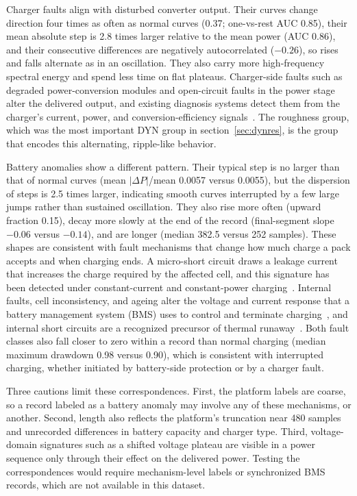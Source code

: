 \documentclass{iopjournal}
\begin{document}
Charger faults align with disturbed converter output. Their curves change direction four times as often as normal curves (0.37; one-vs-rest AUC 0.85), their mean absolute step is 2.8 times larger relative to the mean power (AUC 0.86), and their consecutive differences are negatively autocorrelated ($-0.26$), so rises and falls alternate as in an oscillation. They also carry more high-frequency spectral energy and spend less time on flat plateaus. Charger-side faults such as degraded power-conversion modules and open-circuit faults in the power stage alter the delivered output, and existing diagnosis systems detect them from the charger's current, power, and conversion-efficiency signals~\cite{park2022,xu2025}. The roughness group, which was the most important DYN group in section~\ref{sec:dynres}, is the group that encodes this alternating, ripple-like behavior.

Battery anomalies show a different pattern. Their typical step is no larger than that of normal curves (mean $|\Delta P|$/mean 0.0057 versus 0.0055), but the dispersion of steps is 2.5 times larger, indicating smooth curves interrupted by a few large jumps rather than sustained oscillation. They also rise more often (upward fraction 0.15), decay more slowly at the end of the record (final-segment slope $-0.06$ versus $-0.14$), and are longer (median 382.5 versus 252 samples). These shapes are consistent with fault mechanisms that change how much charge a pack accepts and when charging ends. A micro-short circuit draws a leakage current that increases the charge required by the affected cell, and this signature has been detected under constant-current and constant-power charging~\cite{kong2018}. Internal faults, cell inconsistency, and ageing alter the voltage and current response that a battery management system (BMS) uses to control and terminate charging~\cite{lu2013,hu2020}, and internal short circuits are a recognized precursor of thermal runaway~\cite{feng2018}. Both fault classes also fall closer to zero within a record than normal charging (median maximum drawdown 0.98 versus 0.90), which is consistent with interrupted charging, whether initiated by battery-side protection or by a charger fault.

Three cautions limit these correspondences. First, the platform labels are coarse, so a record labeled as a battery anomaly may involve any of these mechanisms, or another. Second, length also reflects the platform's truncation near 480 samples and unrecorded differences in battery capacity and charger type. Third, voltage-domain signatures such as a shifted voltage plateau are visible in a power sequence only through their effect on the delivered power. Testing the correspondences would require mechanism-level labels or synchronized BMS records, which are not available in this dataset.
\end{document}
